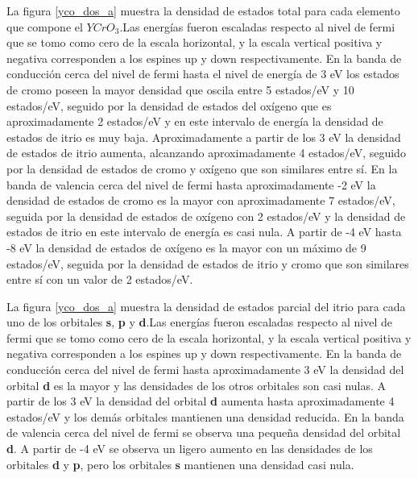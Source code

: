 La figura \ref{yco_dos_a}  muestra la densidad de estados 
total para 
cada 
elemento que compone el $YCrO_{3}$.Las energ\'ias fueron escaladas 
respecto al 
nivel de fermi que se tomo como cero de la escala horizontal, y la 
escala 
vertical positiva y negativa corresponden a los espines up y down 
respectivamente. En la banda de conducci\'on cerca del nivel de fermi 
hasta el nivel de energ\'ia de 3 eV los estados de cromo poseen la 
mayor densidad que oscila entre 5 estados/eV y 10 estados/eV, seguido 
por la densidad de estados del ox\'igeno que es aproximadamente 2 
estados/eV y en este intervalo de energ\'ia la densidad de estados de 
itrio es muy baja. Aproximadamente a partir de los 3 eV la densidad de 
estados de itrio aumenta, alcanzando aproximadamente 4 estados/eV, 
seguido por la densidad de estados de cromo y ox\'igeno que son 
similares entre s\'i. En la banda de valencia cerca del nivel de fermi 
hasta aproximadamente -2 eV la densidad de estados de cromo es la 
mayor con aproximadamente 7 estados/eV, seguida por la densidad de 
estados de ox\'igeno con 2 estados/eV y la densidad de estados de 
itrio en este intervalo de energ\'ia es casi nula. A partir de -4 eV 
hasta -8 eV la densidad de estados de ox\'igeno es la mayor con un 
m\'aximo de 9 estados/eV, seguida por la densidad de estados de itrio 
y cromo que son similares entre s\'i con un valor de 2 estados/eV.


\noindent La figura \ref{yco_dos_a}  muestra la densidad de 
estados parcial del 
itrio para 
cada 
uno de los orbitales \textbf{s}, \textbf{p} y \textbf{d}.Las 
energ\'ias fueron escaladas 
respecto al 
nivel de fermi que se tomo como cero de la escala horizontal, y la 
escala 
vertical positiva y negativa corresponden a los espines up y down 
respectivamente. En la banda de conducci\'on cerca del nivel de fermi 
hasta aproximadamente 3 eV la densidad del orbital \textbf{d} es la 
mayor y las densidades de los otros orbitales son casi nulas. A partir 
de los 3 eV la densidad del orbital \textbf{d} aumenta hasta 
aproximadamente 4 estados/eV y los dem\'as orbitales mantienen una 
densidad reducida. En la banda de valencia cerca del nivel de fermi se 
observa una peque\~na densidad del orbital \textbf{d}. A partir de -4 
eV se observa un ligero aumento en las densidades de los orbitales 
\textbf{d} y \textbf{p}, pero los orbitales \textbf{s} mantienen una 
densidad casi nula.



